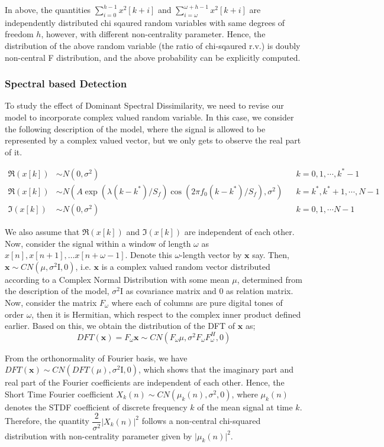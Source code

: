 \documentclass[10pt]{article}
\begin{document}
In above, the quantities $\sum_{i=0}^{h - 1}x^2[k+i]$ and $\sum_{i=\omega}^{\omega + h - 1}x^2[k+i]$ are independently distributed chi sqaured random variables with same degrees of freedom $h$, however, with different non-centrality parameter. Hence, the distribution of the above random variable (the ratio of chi-sqaured r.v.) is doubly non-central F distribution, and the above probability can be explicitly computed.

\subsubsection{Spectral based Detection}
\qquad To study the effect of Dominant Spectral Dissimilarity, we need to revise our model to incorporate complex valued random variable. In this case, we consider the following description of the model, where the signal is allowed to be represented by a complex valued vector, but we only gets to observe the real part of it.

\begin{align*}
 \Re{(x[k])} & \sim N(0, \sigma^2) && k=0,1,\cdots, k^*-1\\ 
 \Re{(x[k])} & \sim N(A\exp{(\lambda(k-k^*)/S_f)}\cos{\left(2\pi f_0(k - k^*)/S_f\right)}, \sigma^2) && k=k^*,k^* + 1,\cdots, N-1 \\
 \Im{(x[k])} & \sim N(0, \sigma^2) && k = 0,1,\cdots N-1
\end{align*}

We also assume that $\Re{(x[k])}$ and $\Im{(x[k])}$ are independent of each other. Now, consider the signal within a window of length $\omega$ as $x[n], x[n+1], \dots x[n+\omega - 1]$. Denote this $\omega$-length vector by $\textbf{x}$ say. Then, $\textbf{x} \sim CN(\mu, \sigma^2\text{I}, 0)$, i.e. $\textbf{x}$ is a complex valued random vector distributed according to a Complex Normal Distribution with some mean $\mu$, determined from the description of the model, $\sigma^2\text{I}$ as covariance matrix and $0$ as relation matrix. Now, consider the matrix $F_\omega$ where each of columns are pure digital tones of order $\omega$, then it is Hermitian, which respect to the complex inner product defined earlier. Based on this, we obtain the distribution of the DFT of $\textbf{x}$ as;
$$DFT\left(\textbf{x}\right) = F_\omega\textbf{x} \sim CN(F_\omega \mu, \sigma^2 F_\omega F_{\omega}^{H}, 0)$$

From the orthonormality of Fourier basis, we have $DFT\left(\textbf{x}\right) \sim CN(DFT\left(\mu\right), \sigma^2\text{I}, 0)$, which shows that the imaginary part and real part of the Fourier coefficients are independent of each other. Hence, the Short Time Fourier coefficient $X_{k}(n) \sim CN(\mu_k(n), \sigma^2, 0)$, where $\mu_k(n)$ denotes the STDF coefficient of discrete frequency $k$ of the mean signal at time $k$. Therefore, the quantity $\dfrac{2}{\sigma^2}\vert X_k(n)\vert^2$ follows a non-central chi-squared distribution with non-centrality parameter given by $\vert\mu_k(n)\vert^2$.
\end{document}
